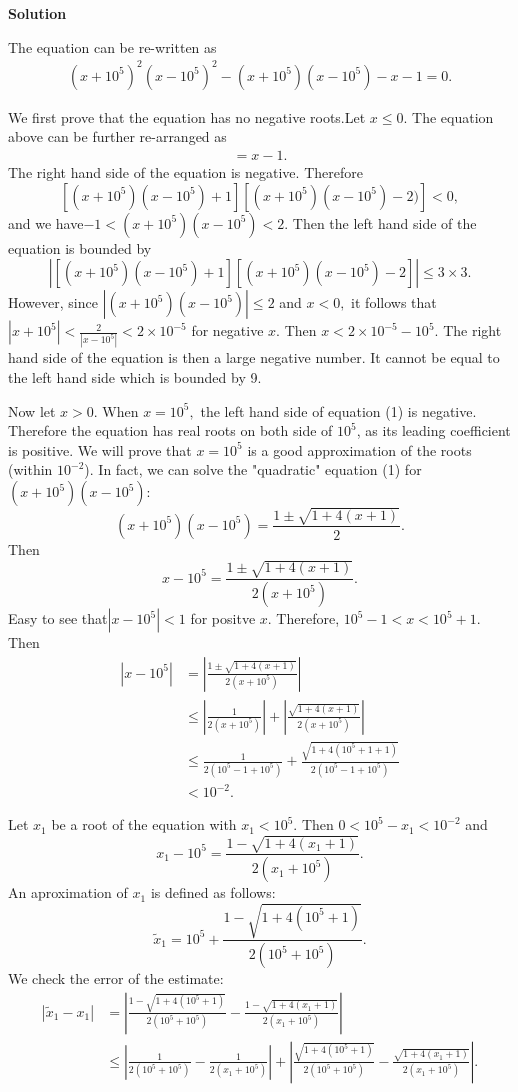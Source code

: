 \begin{enumerate}
 



\textbf{Solution}

The equation can be re-written as 
 \begin{align}\label{eqn1} (x+10^5)^2(x-10^5)^2 -(x+10^5)(x-10^5) -x-1=0. \end{align}

 We first prove that the equation has no negative roots.Let $x\le 0.$ The equation above can be further re-arranged as
 \begin{align*}[(x+10^5)(x-10^5)+1][(x+10^5)(x-10^5)-2]=x-1.\end{align*}
The right hand side of the equation is negative. Therefore 
 \[[(x+10^5)(x-10^5)+1][(x+10^5)(x-10^5)-2)]<0,\] and we have$-1<(x+10^5)(x-10^5) <2.$ Then the left hand side of the equation is bounded by
 \[|[(x+10^5)(x-10^5)+1][(x+10^5)(x-10^5)-2]|\le 3\times 3.\]However, since $|(x+10^5)(x-10^5)|\le 2$ and $x<0,$ it follows that $|x+10^5| <\frac{2}{|x-10^5|}<2\times 10^{-5}$ for negative $x.$ Then $x<2\times 10^{-5}-10^5.$ The right hand side of the equation is then a large negative number. It cannot be equal to the left hand side which is bounded by 9.

 Now let $x>0.$ When $x=10^5,$ the left hand side of equation (1) is negative. Therefore the equation has real roots on both side of $10^5$, as its leading coefficient is positive. We will prove that $x=10^5$ is a good approximation of the roots (within $10^{-2}$). In fact, we can solve the "quadratic" equation (1) for $(x+10^5)(x-10^5)$:
 \[(x+10^5)(x-10^5)=\frac{1\pm\sqrt{1+4(x+1)}}{2}.\]Then 
 \[x-10^5=\frac{1\pm\sqrt{1+4(x+1)}}{2(x+10^5)}.\]Easy to see that$|x-10^5| <1$ for positve $x.$ Therefore, $10^5-1<x<10^5+1.$ Then
 \begin{align*} |x-10^5|&=\left|\frac{1\pm\sqrt{1+4(x+1)}}{2(x+10^5)}\right |\\ &\le \left |\frac{1}{2(x+10^5)}\right |+\left |\frac{\sqrt{1+4(x+1)}}{2(x+10^5)}\right |\\ &\le \frac{1}{2(10^5-1+10^5)} +\frac{\sqrt{1+4(10^5+1+1)}}{2(10^5-1+10^5)} \\ &<10^{-2}. \end{align*}


 Let $x_1$ be a root of the equation with $x_1<10^5.$ Then $0<10^5-x_1<10^{-2}$ and 
 \[x_1-10^5=\frac{1-\sqrt{1+4(x_1+1)}}{2(x_1+10^5)}.\]An aproximation of $x_1$ is defined as follows:
 \[\tilde{x}_1=10^5+\frac{1-\sqrt{1+4(10^5+1)}}{2(10^5+10^5)}.\]We check the error of the estimate:
 \begin{align*} |\tilde{x}_1-x_1|&=\left | \frac{1-\sqrt{1+4(10^5+1)}}{2(10^5+10^5)}- \frac{1-\sqrt{1+4(x_1+1)}}{2(x_1+10^5)} \right | \\ &\le \left |\frac{1}{2(10^5+10^5)}- \frac{1}{2(x_1+10^5)}\right |+\left |\frac{\sqrt{1+4(10^5+1)}}{2(10^5+10^5)}- \frac{\sqrt{1+4(x_1+1)}}{2(x_1+10^5)}\right |. \end{align*}



\end{enumerate}

